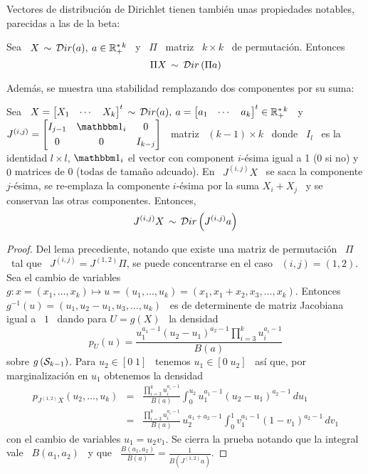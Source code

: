 Vectores  de  distribuci\'on  de  Dirichlet tienen  tambi\'en  unas  propiedades
notables, parecidas a las de la beta:
%
\begin{lema}[Reflexividad]
\label{Lem:MP:ReflexividadDir}
%
Sea \ $X \, \sim  \, \mathcal{D}ir(a), \: a \in \mathbb{R}_+^{* \, k}$ \  y \ $\Pi$ \ matriz \
$k \times k$ \ de permutaci\'on. Entonces
  \[
  \Pi X \, \sim \, \mathcal{D}ir\left( \Pi a \right)
  \]
\end{lema}
%
Adem\'as, se muestra una stabilidad remplazando dos componentes por su suma:
%
\begin{lema}
\label{Lem:MP:StabSumaDir}
%
  Sea  \ $X =  \begin{bmatrix} X_1  & \cdots  & X_k  \end{bmatrix}^t \,  \sim \,
  \mathcal{D}ir(a), \: a = \begin{bmatrix} a_1 & \cdots & a_k \end{bmatrix}^t \in
  \mathbb{R}_+^{* \, k}$ \ y \ $J^{(i,j)} = \begin{bmatrix} I_{j-1} & \un_i & 0 \\[1mm]
    0 & 0 & I_{k-j}\end{bmatrix}$ \ matriz  \ $(k-1) \times k$ \ donde \ $I_l$ \
  es  la identidad $l  \times l$,  $\un_i$ el  vector con  component $i$-\'esima
  igual a  1 (0 si no)  y $0$ matrices de  0 (todas de tama\~no  adcuado).  En \
  $J^{(i,j)} X$ \ se saca la componente $j$-\'esima, se re-emplaza la componente
  $i$-\'esima  por   la  suma  $X_i   +  X_j$  \   y  se  conservan   las  otras
  componentes. Entonces,
  \[
  J^{(i,j)} X \, \sim \, \mathcal{D}ir\left( J^{(i,j)} a \right)  
  \]
\end{lema}
%
\begin{proof}
  Del lema precediente, notando que existe una matriz de permutaci\'on \ $\Pi$ \
  tal que  \ $J^{(i,j)}  = J^{(1,2)} \Pi$,  se puede  concentrarse en el  caso \
  $(i,j) = (1,2)$. Sea el cambio de variables $g: x = (x_1,\ldots,x_k) \mapsto u
  =  (u_1,\ldots,u_k) = (x_1,x_1+x_2,x_3,\ldots,x_k)$.  Entonces \  $g^{-1}(u) =
  (u_1,u_2-u_1,u_3,\ldots,u_k)$ \ es de determinente de matriz Jacobiana igual a
  \ $1$ \ dando para $U = g(X)$ \ la densidad
  \[
  p_U(u)  = \frac{u_1^{a_1-1}  \left(  u_2 -  u_1 \right)^{a_2-1}  \prod_{i=3}^k
    u_i^{a_i-1}}{B(a)}
  \]
  sobre $g\left(  \mathcal{S}_{k-1} \right)$. Para $u_2  \in [0 \; 1]$  \ tenemos $u_1
  \in [  0 \;  u_2]$ \ as\'i  que, por  marginalizaci\'on en $u_1$  obtenemos la
  densidad
  \begin{eqnarray*}
  p_{J^{(1,2)} X}(u_2,\ldots,u_k) & = & \frac{\prod_{i=3}^k u_i^{a_i-1}}{B(a)}
  \int_0^{u_2} u_1^{a_1-1} \left( u_2 - u_1 \right)^{a_2-1} \, du_1\\[2mm]
  & = & \frac{\prod_{i=3}^k u_i^{a_i-1}}{B(a)} \, u_2^{a_1+a_2-1} \int_0^1
  v_1^{a_1-1} \left( 1 - v_1 \right)^{a_2-1} \, dv_1
  \end{eqnarray*}
  con el cambio de variables $u_1 = u_2 v_1$. Se cierra la prueba notando que la
  integral   vale  \  $B(a_1,a_2)$   \  y   que  \   $\frac{B(a_1,a_2)}{B(a)}  =
  \frac{1}{B\left( J^{(1,2)} a \right)}$.
\end{proof}

